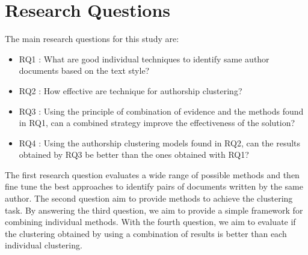 \section{Research Questions}

The main research questions for this study are:

\begin{itemize}
  \item
  RQ1 : What are good individual techniques to identify same author documents based on the text style?
  \item
  RQ2 : How effective are technique for authorship clustering?
  \item
  RQ3 : Using the principle of combination of evidence and the methods found in RQ1, can a combined strategy improve the effectiveness of the solution?
  \item
  RQ4 : Using the authorship clustering models found in RQ2, can the results obtained by RQ3 be better than the ones obtained with RQ1?
\end{itemize}

The first research question evaluates a wide range of possible methods and then fine tune the best approaches to identify pairs of documents written by the same author.
The second question aim to provide methods to achieve the clustering task.
By answering the third question, we aim to provide a simple framework for combining individual methods.
With the fourth question, we aim to evaluate if the clustering obtained by using a combination of results is better than each individual clustering.
